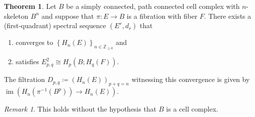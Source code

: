 \documentclass[10pt,letterpaper,cm]{nupset}
\theoremstyle{definition}
\theoremstyle{theorem}
\newtheorem{theorem}[defn]{Theorem}
\theoremstyle{remark}
\newtheorem{remark}[defn]{Remark}
\newcommand{\Z}{\mathbb Z}
\newcommand{\1}{\mathbb{1}}
\newcommand{\0}{\vec 0}
\DeclareMathOperator{\im}{im}
\newcommand{\be}{\begin{enumerate}}
\newcommand{\ee}{\end{enumerate}}
\begin{document}
\begin{theorem}\label{spfib}
Let $B$ be a simply connected, path connected cell complex with $n$-skeleton $B^n$ and suppose that $\pi: E \to B$ is a fibration with fiber $F$. There exists a (first-quadrant) spectral sequence $\left(E^r, d_r\right)$ that
\be[label=(\alph*)]
\item converges to $\left\{H_n(E)\right\}_{n\in \Z_{\geq 0}}$ and
\item satisfies $E_{p,q}^2 \cong H_p(B; H_q(F))$.
\ee
The filtration $D_{p,q} \coloneqq \left(H_n(E)\right)_{p+q=n}$ witnessing this convergence is given by $\im(H_n(\pi^{-1}(B^p)) \to H_n(E))$.
\end{theorem}

\begin{remark}
This holds without the hypothesis that $B$ is a cell complex.
\end{remark}
\end{document}
